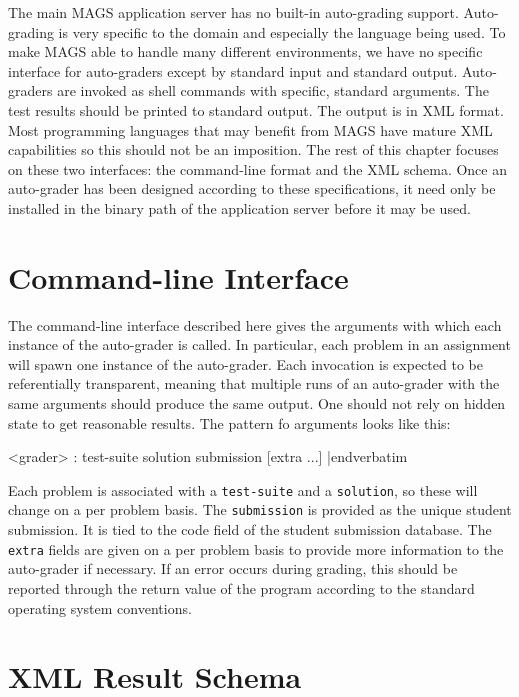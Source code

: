 The main MAGS application server has no built-in auto-grading support. 
Auto-grading is very specific to the domain and especially the language
being used. To make MAGS able to handle many different environments, 
we have no specific interface for auto-graders except by standard input and 
standard output. Auto-graders are invoked as shell commands with specific, 
standard arguments. The test results should be printed to standard output. The 
output is in XML format. Most programming languages that may benefit from MAGS
have mature XML capabilities so this should not be an imposition. The rest of 
this chapter focuses on these two interfaces: the command-line format and 
the XML schema. Once an auto-grader has been designed according to these 
specifications, it need only be installed in the binary path of the application
server before it may be used.

\section{Command-line Interface}

\noindent
The command-line interface described here gives the arguments with which each 
instance of the auto-grader is called. In particular, each problem in an 
assignment will spawn one instance of the auto-grader. Each invocation is 
expected to be referentially transparent, meaning that multiple runs of an 
auto-grader with the same arguments should produce the same output. One should 
not rely on hidden state to get reasonable results. The pattern fo arguments
looks like this:

\medskip\verbatim
<grader> : test-suite solution submission [extra ...]
|endverbatim\medskip

\noindent
Each problem is associated with a {\tt test-suite} and a {\tt solution}, so 
these will change on a per problem basis. The {\tt submission} is provided 
as the unique student submission. It is tied to the code field of the student
submission database. The {\tt extra} fields are given on a per problem basis
to provide more information to the auto-grader if necessary. If an error 
occurs during grading, this should be reported through the return value of 
the program according to the standard operating system conventions.

\section{XML Result Schema}

